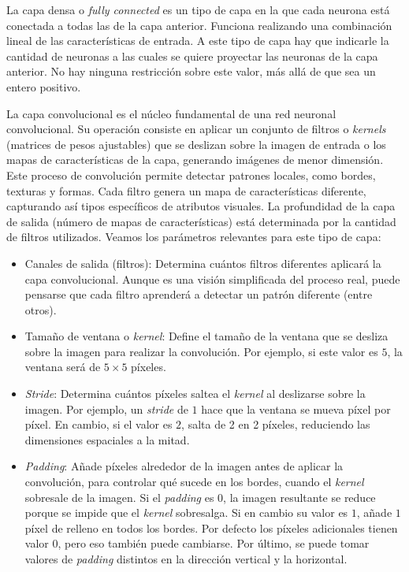 \vspace{1cm}


La capa densa o \emph{fully connected} es un tipo de capa en la que cada neurona está conectada a todas las de la capa anterior. Funciona realizando una combinación lineal de las características de entrada. A este tipo de capa hay que indicarle la cantidad de neuronas a las cuales se quiere proyectar las neuronas de la capa anterior. No hay ninguna restricción sobre este valor, más allá de que sea un entero positivo.


La capa convolucional es el núcleo fundamental de una red neuronal convolucional. Su operación consiste en aplicar un conjunto de filtros o \emph{kernels} (matrices de pesos ajustables) que se deslizan sobre la imagen de entrada o los mapas de características de la capa, generando imágenes de menor dimensión. Este proceso de convolución permite detectar patrones locales, como bordes, texturas y formas. Cada filtro genera un mapa de características diferente, capturando así tipos específicos de atributos visuales. La profundidad de la capa de salida (número de mapas de características) está determinada por la cantidad de filtros utilizados. Veamos los parámetros relevantes para este tipo de capa:
\begin{itemize}
    \item Canales de salida (filtros): Determina cuántos filtros diferentes aplicará la capa convolucional. Aunque es una visión simplificada del proceso real, puede pensarse que cada filtro aprenderá a detectar un patrón diferente (entre otros).
    
    \item Tamaño de ventana o \emph{kernel}: Define el tamaño de la ventana que se desliza sobre la imagen para realizar la convolución. Por ejemplo, si este valor es $5$, la ventana será de $5\times5$ píxeles.
    
    \item \emph{Stride}: Determina cuántos píxeles saltea el \emph{kernel} al deslizarse sobre la imagen. Por ejemplo, un \emph{stride} de $1$ hace que la ventana se mueva píxel por píxel. En cambio, si el valor es $2$, salta de 2 en 2 píxeles, reduciendo las dimensiones espaciales a la mitad.
    
    \item \emph{Padding}: Añade píxeles alrededor de la imagen antes de aplicar la convolución, para controlar qué sucede en los bordes, cuando el \emph{kernel} sobresale de la imagen. Si el \emph{padding} es $0$, la imagen resultante se reduce porque se impide que el \emph{kernel} sobresalga. Si en cambio su valor es $1$, añade $1$ píxel de relleno en todos los bordes. Por defecto los píxeles adicionales tienen valor $0$, pero eso también puede cambiarse. Por último, se puede tomar valores de \emph{padding} distintos en la dirección vertical y la horizontal.
\end{itemize}

